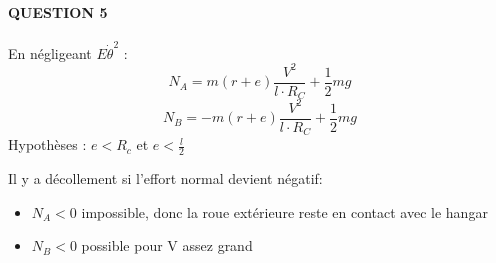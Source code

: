\paragraph{QUESTION 5}
En négligeant $E\dot\theta^2$ :
\begin{equation}
	N_A = m(r+e)\frac{V^2}{l\cdot R_C} + \frac{1}{2}mg
\end{equation}
\begin{equation}
	N_B = -m(r+e)\frac{V^2}{l\cdot R_C} + \frac{1}{2}mg
\end{equation}
Hypothèses : $e<R_c$ et $e<\frac{l}{2}$

Il y a décollement si l'effort normal devient négatif:
\begin{itemize}
	\item $N_A<0$ impossible, donc la roue extérieure reste en contact avec le hangar
	\item $N_B<0$ possible pour V assez grand
\end{itemize}
